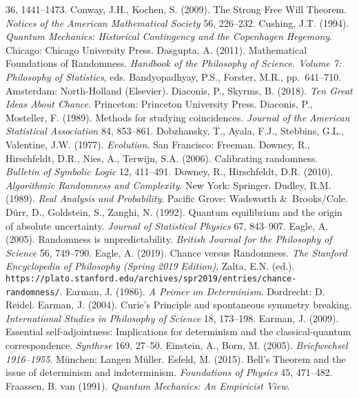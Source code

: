 \documentclass[12pt]{article}
\numberwithin{equation}{section}
\begin{document}
\begin{thebibliography}{99}
 36, 1441--1473.
\bibitem{} Conway, J.H., Kochen, S. (2009).
The Strong Free Will Theorem.
 \emph{Notices of the American Mathematical Society} 56, 226--232.
 \bibitem{} Cushing, J.T. (1994). 
 \emph{Quantum Mechanics: Historical Contingency and the Copenhagen Hegemony}. Chicago: Chicago University Press.  
\bibitem{} Dasgupta, A. (2011). Mathematical Foundations of Randomness. \emph{Handbook of the Philosophy of Science. Volume 7: Philosophy of Statistics}, eds. Bandyopadhyay, P.S., Forster, M.R., pp.\ 641--710. Amsterdam: North-Holland (Elsevier).
\bibitem{} Diaconis, P., Skyrms, B. (2018). \emph{Ten Great Ideas About Chance}. Princeton: Princeton University Press.  
\bibitem{} 
 Diaconis, P., Mosteller, F. (1989). Methods for studying coincidences. \emph{Journal of the American Statistical Association} 84, 853--861.
\bibitem{}  Dobzhansky, T., Ayala, F.J., Stebbins, G.L., Valentine, J.W. (1977). \emph{Evolution}. San Francisco: Freeman.  
\bibitem{} Downey, R.,  Hirschfeldt, D.R., Nies, A., Terwijn, S.A. (2006). 
Calibrating randomness. \emph{Bulletin of Symbolic Logic} 12, 411--491. 
\bibitem{} Downey, R.,  Hirschfeldt,  D.R. (2010). \emph{Algorithmic Randomness and Complexity}. New York: Springer. 
\bibitem{}Dudley, R.M. (1989). \emph{Real Analysis and Probability}. Pacific Grove: Wadsworth \&\ Brooks/Cole.
\bibitem{} D\"{u}rr, D., Goldstein, S., Zanghi, N. (1992). Quantum equilibrium and the origin of absolute uncertainty.
\emph{Journal of Statistical Physics} 67, 843--907. 
\bibitem{} Eagle, A. (2005). Randomness is unpredictability. \emph{British Journal for the Philosophy of Science} 56, 749--790. 
\bibitem{} Eagle, A. (2019).  Chance versus Randomness. \emph{The Stanford Encyclopedia of Philosophy (Spring 2019 Edition)}, Zalta, E.N.  (ed.). \\ \verb#https://plato.stanford.edu/archives/spr2019/entries/chance-randomness/#.
\bibitem{} Earman, J. (1986).  \emph{A Primer on Determinism}. Dordrecht: D. Reidel. 
\bibitem{} Earman, J. (2004). Curie's Principle and spontaneous symmetry breaking. \emph{International Studies in  Philosophy of Science} 18, 173--198. 
\bibitem{} Earman, J. (2009). Essential self-adjointness: Implications for determinism and the classical-quantum correspondence.
\emph{Synthese} 169, 27--50. 
\bibitem{}  Einstein, A., Born, M. (2005). \emph{Briefwechsel 1916--1955}. M\"{u}nchen: Langen M\"{u}ller.
\bibitem{}  Esfeld, M. (2015). Bell's Theorem and the issue of determinism and indeterminism.
\emph{Foundations of Physics} 45, 471--482.
\bibitem{}Fraassen, B. van (1991). \emph{Quantum Mechanics: An Empiricist View}. 

\end{thebibliography}
\end{document}
